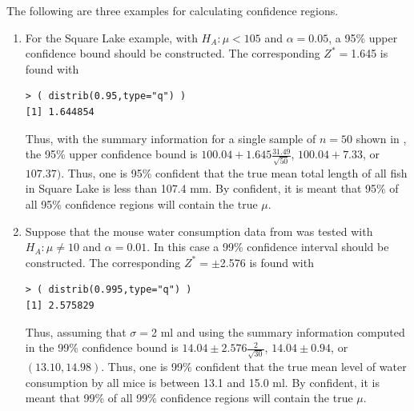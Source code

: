 \documentclass[10pt,openany]{book}\usepackage[]{graphicx}\usepackage[]{color}
\makeatletter
\newenvironment{kframe}{%
 \def\at@end@of@kframe{}%
 \ifinner\ifhmode%
  \def\at@end@of@kframe{\end{minipage}}%
  \begin{minipage}{\columnwidth}%
 \fi\fi%
 \def\FrameCommand##1{\hskip\@totalleftmargin \hskip-\fboxsep
 \colorbox{shadecolor}{##1}\hskip-\fboxsep
     \hskip-\linewidth \hskip-\@totalleftmargin \hskip\columnwidth}%
 \MakeFramed {\advance\hsize-\width
   \@totalleftmargin\z@ \linewidth\hsize
   \@setminipage}}%
 {\par\unskip\endMakeFramed%
 \at@end@of@kframe}
\newenvironment{knitrout}{}{} %
\makeatother
\begin{document}

\vspace{-12pt}

The following are three examples for calculating confidence regions.
\begin{enumerate}
  \item For the Square Lake example, with $H_{A}:\mu < 105$ and $\alpha=0.05$, a 95\% upper confidence bound should be constructed.  The corresponding $Z^{*}=$1.645 is found with
\begin{knitrout}
\color{fgcolor}\begin{kframe}
\begin{verbatim}
> ( distrib(0.95,type="q") )
[1] 1.644854
\end{verbatim}
\end{kframe}
\end{knitrout}
Thus, with the summary information for a single sample of $n=50$ shown in , the 95\% upper confidence bound is $100.04+1.645\frac{31.49}{\sqrt{50}}$, $100.04+7.33$, or $107.37)$.  Thus, one is 95\% confident that the true mean total length of all fish in Square Lake is less than 107.4 mm.  By confident, it is meant that 95\% of all 95\% confidence regions will contain the true $\mu$.

  \item Suppose that the mouse water consumption data from  was tested with $H_{A}:\mu \neq 10$ and $\alpha=0.01$.  In this case a 99\% confidence interval should be constructed.  The corresponding $Z^{*}=\pm$2.576 is found with
\begin{knitrout}
\color{fgcolor}\begin{kframe}
\begin{verbatim}
> ( distrib(0.995,type="q") )
[1] 2.575829
\end{verbatim}
\end{kframe}
\end{knitrout}
Thus, assuming that $\sigma=$2 ml and using the summary information computed in  the 99\% confidence bound is $14.04\pm2.576\frac{2}{\sqrt{30}}$, $14.04\pm0.94$, or $(13.10,14.98)$.  Thus, one is 99\% confident that the true mean level of water consumption by all mice is between 13.1 and 15.0 ml.  By confident, it is meant that 99\% of all 99\% confidence regions will contain the true $\mu$.


\end{enumerate}
\end{document}
